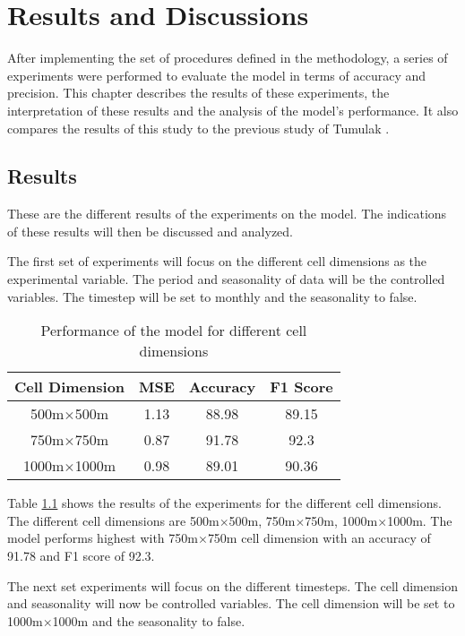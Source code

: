 \chapter{Results and Discussions}
    After implementing the set of procedures defined in the methodology, a series of experiments were performed to evaluate the model in terms of accuracy and precision. This chapter describes the results of these experiments, the interpretation of these results and the analysis of the model's performance. It also compares the results of this study to the previous study of Tumulak \citeyearpar{tumulak2015crime}.
\section{Results}
    These are the different results of the experiments on the model. The indications of these results will then be discussed and analyzed.

    The first set of experiments will focus on the different cell dimensions as the experimental variable. The period and seasonality of data will be the controlled variables. The timestep will be set to monthly and the seasonality to false.

    \begin{table}[H]
      \centering
      \begin{tabular}{|c|c|c|c|}
            \hline
          \textbf{Cell Dimension}  &\textbf{MSE}  &\textbf{Accuracy} &\textbf{F1 Score}\\ 
          \hline
          500m\(\times\)500m &1.13 &88.98 &89.15 \\
          750m\(\times\)750m &0.87 &91.78 &92.3 \\
          1000m\(\times\)1000m  &0.98 &89.01 &90.36 \\
          \hline
        \end{tabular}
      \caption{Performance of the model for different cell dimensions}
      \label{table:dimension-results}
    \end{table}
    Table \ref{table:dimension-results} shows the results of the experiments for the different cell dimensions. The different cell dimensions are 500m\(\times\)500m, 750m\(\times\)750m, 1000m\(\times\)1000m. The model performs highest with 750m\(\times\)750m cell dimension with an accuracy of 91.78 and F1 score of 92.3.

    The next set experiments will focus on the different timesteps. The cell dimension and seasonality will now be controlled variables. The cell dimension will be set to 1000m\(\times\)1000m and the seasonality to false.

